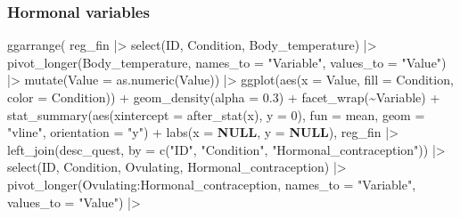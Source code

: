 \documentclass[
  bookmarksnumbered]{article}
\newenvironment{Shaded}{\begin{snugshade}}{\end{snugshade}}
\newcommand{\AttributeTok}[1]{\textcolor[rgb]{0.80,0.80,0.80}{#1}}
\newcommand{\ConstantTok}[1]{\textcolor[rgb]{0.86,0.64,0.64}{\textbf{#1}}}
\newcommand{\DecValTok}[1]{\textcolor[rgb]{0.86,0.86,0.80}{#1}}
\newcommand{\FloatTok}[1]{\textcolor[rgb]{0.75,0.75,0.82}{#1}}
\newcommand{\FunctionTok}[1]{\textcolor[rgb]{0.94,0.94,0.56}{#1}}
\newcommand{\NormalTok}[1]{\textcolor[rgb]{0.80,0.80,0.80}{#1}}
\newcommand{\SpecialCharTok}[1]{\textcolor[rgb]{0.86,0.64,0.64}{#1}}
\newcommand{\StringTok}[1]{\textcolor[rgb]{0.80,0.58,0.58}{#1}}
\begin{document}
\subsubsection{Hormonal variables}\label{hormonal-variables}

\begin{Shaded}
\begin{Highlighting}[]
\FunctionTok{ggarrange}\NormalTok{(}
\NormalTok{  reg\_fin }\SpecialCharTok{|\textgreater{}}
    \FunctionTok{select}\NormalTok{(ID, Condition, Body\_temperature) }\SpecialCharTok{|\textgreater{}}
    \FunctionTok{pivot\_longer}\NormalTok{(Body\_temperature,}
                 \AttributeTok{names\_to =} \StringTok{"Variable"}\NormalTok{,}
                 \AttributeTok{values\_to =} \StringTok{"Value"}\NormalTok{) }\SpecialCharTok{|\textgreater{}}
    \FunctionTok{mutate}\NormalTok{(}\AttributeTok{Value =} \FunctionTok{as.numeric}\NormalTok{(Value)) }\SpecialCharTok{|\textgreater{}}
    \FunctionTok{ggplot}\NormalTok{(}\FunctionTok{aes}\NormalTok{(}\AttributeTok{x =}\NormalTok{ Value, }\AttributeTok{fill =}\NormalTok{ Condition, }\AttributeTok{color =}\NormalTok{ Condition)) }\SpecialCharTok{+}
    \FunctionTok{geom\_density}\NormalTok{(}\AttributeTok{alpha =} \FloatTok{0.3}\NormalTok{) }\SpecialCharTok{+}
    \FunctionTok{facet\_wrap}\NormalTok{(}\SpecialCharTok{\textasciitilde{}}\NormalTok{Variable) }\SpecialCharTok{+}
    \FunctionTok{stat\_summary}\NormalTok{(}\FunctionTok{aes}\NormalTok{(}\AttributeTok{xintercept =} \FunctionTok{after\_stat}\NormalTok{(x), }\AttributeTok{y =} \DecValTok{0}\NormalTok{),}
                 \AttributeTok{fun =}\NormalTok{ mean, }\AttributeTok{geom =} \StringTok{"vline"}\NormalTok{, }\AttributeTok{orientation =} \StringTok{"y"}\NormalTok{) }\SpecialCharTok{+}
    \FunctionTok{labs}\NormalTok{(}\AttributeTok{x =} \ConstantTok{NULL}\NormalTok{, }\AttributeTok{y =} \ConstantTok{NULL}\NormalTok{),}
\NormalTok{  reg\_fin }\SpecialCharTok{|\textgreater{}}
    \FunctionTok{left\_join}\NormalTok{(desc\_quest, }\AttributeTok{by =} \FunctionTok{c}\NormalTok{(}\StringTok{"ID"}\NormalTok{, }\StringTok{"Condition"}\NormalTok{, }\StringTok{"Hormonal\_contraception"}\NormalTok{)) }\SpecialCharTok{|\textgreater{}}
    \FunctionTok{select}\NormalTok{(ID, Condition, Ovulating, Hormonal\_contraception) }\SpecialCharTok{|\textgreater{}}
    \FunctionTok{pivot\_longer}\NormalTok{(Ovulating}\SpecialCharTok{:}\NormalTok{Hormonal\_contraception,}
                 \AttributeTok{names\_to =} \StringTok{"Variable"}\NormalTok{,}
                 \AttributeTok{values\_to =} \StringTok{"Value"}\NormalTok{) }\SpecialCharTok{|\textgreater{}}

\end{Highlighting}
\end{Shaded}
\end{document}
